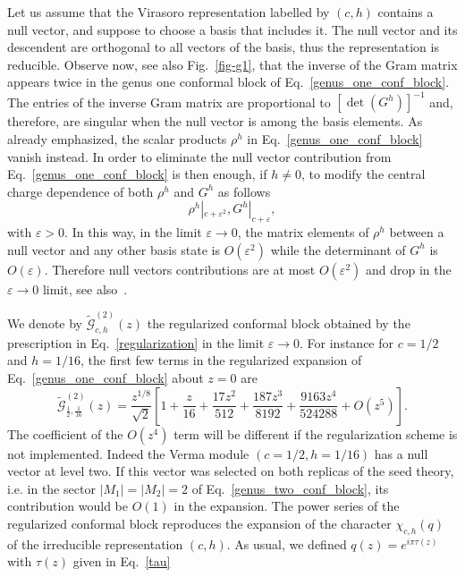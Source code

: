 \documentclass[a4paper,11pt]{article}
\begin{document}
Let us assume that the Virasoro representation labelled by $(c, h)$
contains a null vector, and suppose to choose a basis  that   includes it. The null vector and its descendent are orthogonal to all 
vectors of the basis, thus the representation is reducible.  Observe now, see also Fig.~\ref{fig-g1}, that the inverse of the Gram matrix appears twice in the
genus one conformal block of Eq.~\eqref{genus_one_conf_block}. The 
entries of the inverse Gram matrix are proportional to $[\det(G^h)]^{-1}$ 
and, therefore, are singular when the null vector is among the basis 
elements. As already emphasized, the scalar products $\rho^h$ in Eq.~\eqref{genus_one_conf_block} 
vanish instead. In order to eliminate the null vector contribution from Eq.~\eqref{genus_one_conf_block} is then
enough, if $h\neq0$, to modify the central charge dependence of both 
$\rho^h$ and $G^h$ as follows 
\begin{equation}\label{regularization}
 \rho^h|_{c+\varepsilon^2}, G^h|_{c+\varepsilon},
\end{equation}
with $\varepsilon>0$. In this way, in the limit $\varepsilon\to 0$, the matrix elements of $\rho^h$ between a null vector and any other basis state is $O(\varepsilon^2)$ while the determinant of $G^h$ is $O(\varepsilon)$. Therefore null vectors contributions are at most $O(\varepsilon^2)$ and drop in the $\varepsilon\rightarrow 0$ limit, see also~\cite{SV, Javerzat, Alkalaev}.

We denote by $\tilde{\mathcal{G}}_{c, h}^{(2)}(z)$ the regularized conformal 
block obtained by the prescription in Eq.~\eqref{regularization} in the limit $\varepsilon\to 0$. 
For instance  for $c=1/2$ and $h=1/16$, the first few terms in the regularized expansion of Eq.~\eqref{genus_one_conf_block} about $z=0$ are
\begin{equation}
 \tilde{\mathcal{G}}_{\frac{1}{2},\frac{1}{16}}^{(2)}(z)=
 \frac{z^{1/8}}{\sqrt{2}}\left[1+\frac{z}{16}+\frac{17 z^2}{512}
 +\frac{187 z^3}{8192}+\frac{9163 z^4}{524288}+O(z^5)\right].
\end{equation}
The coefficient of the $O(z^4)$ term will be different if the regularization
scheme is not implemented. Indeed the Verma module $(c=1/2,h=1/16)$ has a null vector at level two. If this vector was selected on both replicas of the seed theory, i.e. in the sector $|M_1|=|M_2|=2$ of Eq.~\eqref{genus_two_conf_block}, its contribution would be $O(1)$ in the expansion.
The power series of the regularized conformal block reproduces the expansion of the character $\chi_{c,h}(q)$ of the irreducible representation $(c,h)$. As usual, we defined $q(z)=e^{i\pi \tau(z)}$ with $\tau(z)$ given in Eq.~\eqref{tau}
\end{document}
